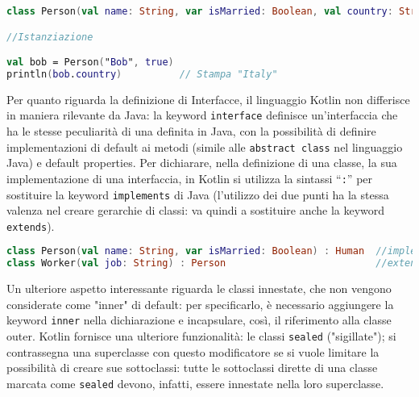 \begin{lstlisting}[caption={Proprietà predefinite}, captionpos=b, label={lst:exampleDefProperties}, language=Kotlin]
class Person(val name: String, var isMarried: Boolean, val country: String = "Italy")

//Istanziazione

val bob = Person("Bob", true)
println(bob.country)          // Stampa "Italy"
\end{lstlisting}

Per quanto riguarda la definizione di Interfacce, il linguaggio Kotlin non differisce in maniera rilevante da Java: la keyword \texttt{interface} definisce un’interfaccia che ha le stesse peculiarità di una definita in Java, con la possibilità di definire implementazioni di default ai metodi (simile alle \texttt{abstract class} nel linguaggio Java) e default properties. Per dichiarare, nella definizione di una classe, la sua implementazione di una interfaccia, in Kotlin si utilizza la sintassi “\texttt{:}” per sostituire la keyword \texttt{implements} di Java (l'utilizzo dei due punti ha la stessa valenza nel creare gerarchie di classi: va quindi a sostituire anche la keyword \texttt{extends}).\\

\begin{lstlisting}[caption={Utilizzo della notazione "\texttt{:}"}, captionpos=b, label={lst:exampleEreditarietà}, language=Kotlin]
class Person(val name: String, var isMarried: Boolean) : Human  //implements
class Worker(val job: String) : Person                          //extends
\end{lstlisting}

Un ulteriore aspetto interessante riguarda le classi innestate, che non vengono considerate come "inner" di default: per specificarlo, è necessario aggiungere la keyword \texttt{inner} nella dichiarazione e incapsulare, così, il riferimento alla classe outer. Kotlin fornisce una ulteriore funzionalità: le classi \texttt{sealed} ("sigillate"); si contrassegna una superclasse con questo modificatore se si vuole limitare la possibilità di creare sue sottoclassi: tutte le sottoclassi dirette di una classe marcata come \texttt{sealed} devono, infatti, essere innestate nella loro superclasse.\\

